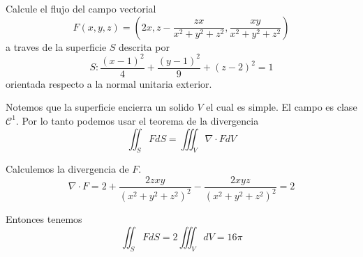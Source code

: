 \message{ !name(MAT024.tex)}\documentclass[../main.tex]{subfiles}
\begin{document}
\begin{problem}
  Calcule el flujo del campo vectorial \begin{equation*} F(x, y, z) = (2x, z - \frac{zx}{x^{2} + y^{2} + z^{2}}, \frac{xy}{x^{2} + y^{2} + z^{2}})\end{equation*} a traves de la superficie $S$ descrita por
  \begin{equation*}
    S: \frac{(x - 1)^{2}}{4} + \frac{(y - 1)^{2}}{9} + (z - 2)^{2} = 1
  \end{equation*}
  orientada respecto a la normal unitaria exterior.
\end{problem}
\begin{solution}
  Notemos que la superficie encierra un solido $V$ el cual es simple. El campo es clase $\mathcal{C}^{1}$. Por lo tanto podemos usar el teorema de la divergencia
  \begin{equation*}
    \iint_{S} F dS = \iiint_{V} \nabla \cdot F dV
  \end{equation*}

  Calculemos la divergencia de $F$.
  \begin{equation*}
    \nabla \cdot F = 2 + \frac{2zxy}{(x^{2} + y^{2} + z^{2})^{2}} - \frac{2xyz}{(x^{2} + y^{2} + z^{2})^{2}} = 2
  \end{equation*}

  Entonces tenemos
  \begin{equation*}
    \iint_{S} F dS = 2 \iiint_{V} dV = 16 \pi
  \end{equation*}
\end{solution}
\end{document}
